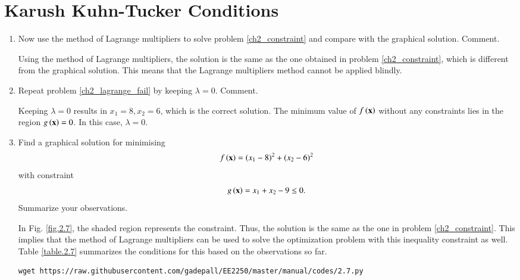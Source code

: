 \documentclass[journal,12pt,twocolumn]{IEEEtran}
\renewcommand\thesection{\arabic{section}}
\begin{document}
\section{Karush Kuhn-Tucker Conditions}
\begin{enumerate}[label=\thesection.\arabic*,ref=\thesection.\theenumi]

\item
\label{ch2_lagrange_fail}
Now use the method of Lagrange multipliers to solve  problem \ref{ch2_constraint} and compare with the graphical solution.  Comment.

%
\solution Using the method of Lagrange multipliers, the solution is the same as the one obtained in  problem \ref{ch2_constraint}, which is different from the graphical solution.  This means that the Lagrange multipliers method cannot be applied blindly.
\item
Repeat problem \ref{ch2_lagrange_fail} by keeping 
 $\lambda=0$.   Comment.

\solution Keeping $\lambda = 0$ results in $x_1 = 8, x_2 = 6$, which is the correct solution.  The minimum value of $f\left(\mathbf{x}\right)$ without any constraints lies in the region $g\left(\mathbf{x}\right) = 0$.  In this case, $\lambda = 0$.  
%
%
\item
\label{ch2_constraint_border}
Find a graphical solution for minimising
\begin{align}
f\left(\mathbf{x}\right) = (x_1-8)^2 + (x_2-6)^2
\end{align}
with constraint
\begin{align}
g\left(\mathbf{x}\right) = x_1 + x_2 - 9 \leq 0.
\end{align}
Summarize your observations.

%
\solution In Fig. \ref{fig.2.7}, the shaded region represents the constraint.  Thus, the solution is the same as the one in problem \ref{ch2_constraint}. This implies that the method of
Lagrange multipliers can be used to solve the optimization problem with this inequality constraint as well.  Table \ref{table.2.7} summarizes the conditions for this based on the observations so far.
\begin{lstlisting}
wget https://raw.githubusercontent.com/gadepall/EE2250/master/manual/codes/2.7.py
\end{lstlisting}


\end{enumerate}
\end{document}
